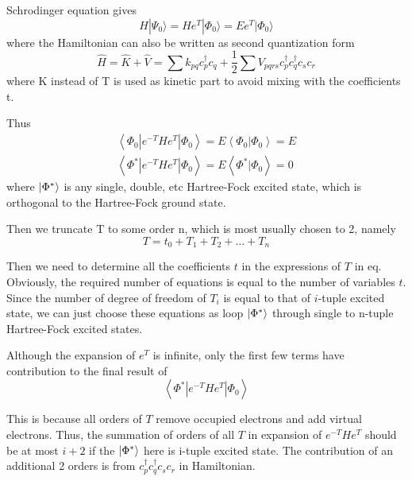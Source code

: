 Schrodinger equation gives
\begin{equation}
H | \Psi_{0} \rangle=H e^{T} | \Phi_{0} \rangle=E e^{T} | \Phi_{0} \rangle
\end{equation}
where the Hamiltonian can also be written as second quantization form
\begin{equation}
\hat{H}=\hat{K}+\hat{V}=\sum k_{p q} c_{p}^{\dagger} c_{q}+\frac{1}{2} \sum V_{p q r s} c_{p}^{\dagger} c_{q}^{\dagger} c_{s} c_{r}
\end{equation}
where K instead of T is used as kinetic part to avoid mixing with the coefficients t.

Thus
\begin{equation}
\begin{array}{l}
{\left\langle\Phi_{0}\left|e^{-T} H e^{T}\right| \Phi_{0}\right\rangle= E\left\langle\Phi_{0} | \Phi_{0}\right\rangle= E}
\\
{\left\langle\Phi^{*}\left|e^{-T} H e^{T}\right| \Phi_{0}\right\rangle= E\left\langle\Phi^{*} | \Phi_{0}\right\rangle= 0}
\end{array}
\end{equation}
where $\ket{\Phi^{*}}$ is any single, double, etc Hartree-Fock excited state, which is orthogonal to the Hartree-Fock ground state.

Then we truncate T to some order n, which is most usually chosen to 2, namely
\begin{equation}
T=t_0+T_1+T_2+ \dots +T_n
\end{equation}

Then we need to determine all the coefficients $t$ in the expressions of $T$ in eq.
Obviously, the required number of equations is equal to the number of variables $t$.
Since the number of degree of freedom of $T_i$ is equal to that of $i$-tuple excited state, we can just choose these equations as loop $\ket{\Phi^{*}}$ through single to n-tuple Hartree-Fock excited states.

Although the expansion of $e^T$ is infinite, only the first few terms have contribution to the final result of 
\begin{equation}
\left\langle\Phi^{*}\left|e^{-T} H e^{T}\right| \Phi_{0}\right\rangle
\end{equation}

This is because all orders of $T$ remove occupied electrons and add virtual electrons.
Thus, the summation of orders of all $T$ in expansion of $e^{-T} H e^{T}$ should be at most $i+2$ if the $\ket{\Phi^{*}}$ here is i-tuple excited state.
The contribution of an additional 2 orders is from $c_{p}^{\dagger} c_{q}^{\dagger} c_{s} c_{r}$ in Hamiltonian.


